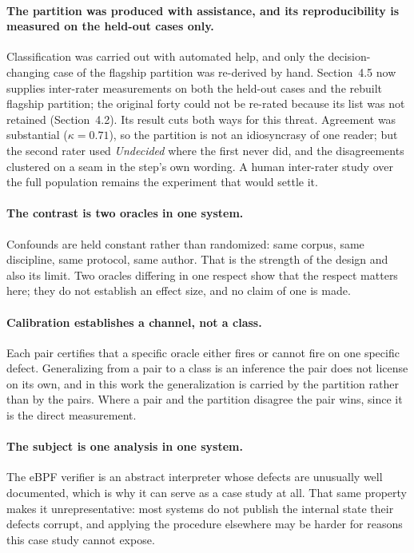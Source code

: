 \paragraph{The partition was produced with assistance, and its reproducibility is
measured on the held-out cases only.}
Classification was carried out with automated help, and only the decision-changing
case of the flagship partition was re-derived by hand. Section~4.5 now supplies
inter-rater measurements on both the held-out cases and the rebuilt flagship
partition; the original forty could not be re-rated because its list was not
retained (Section~4.2). Its result cuts both
ways for this threat. Agreement was substantial ($\kappa = 0.71$), so the partition is
not an idiosyncrasy of one reader; but the second rater used \emph{Undecided} where the
first never did, and the disagreements clustered on a seam in the step's own wording.
A human inter-rater study over the full population remains the experiment that would
settle it.

\paragraph{The contrast is two oracles in one system.}
Confounds are held constant rather than randomized: same corpus, same discipline,
same protocol, same author. That is the strength of the design and also its limit.
Two oracles differing in one respect show that the respect matters here; they do not
establish an effect size, and no claim of one is made.

\paragraph{Calibration establishes a channel, not a class.}
Each pair certifies that a specific oracle either fires or cannot fire on one
specific defect. Generalizing from a pair to a class is an inference the pair does
not license on its own, and in this work the generalization is carried by the
partition rather than by the pairs. Where a pair and the partition disagree the pair
wins, since it is the direct measurement.

\paragraph{The subject is one analysis in one system.}
The eBPF verifier is an abstract interpreter whose defects are unusually well
documented, which is why it can serve as a case study at all. That same property
makes it unrepresentative: most systems do not publish the internal state their
defects corrupt, and applying the procedure elsewhere may be harder for reasons this
case study cannot expose.
